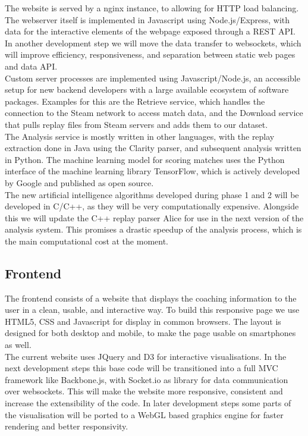 \documentclass[12pt]{report} %
\begin{document}
The website is served by a nginx instance, to allowing for HTTP load balancing. The webserver itself is implemented in Javascript using Node.js/Express, with data for the interactive elements of the webpage exposed through a REST API. In another development step we will move the data transfer to websockets, which will improve efficiency, responsiveness, and separation between static web pages and data API.\\

Custom server processes are implemented using Javascript/Node.js, an accessible setup for new backend developers with a large available ecosystem of software packages. Examples for this are the Retrieve service, which handles the connection to the Steam network to access match data, and the Download service that pulls replay files from Steam servers and adds them to our dataset.\\ 

The Analysis service is mostly written in other languages, with the replay extraction done in Java using the Clarity parser, and subsequent analysis written in Python. The machine learning model for scoring matches uses the Python interface of the machine learning library TensorFlow, which is actively developed by Google and published as open source.\\

The new artificial intelligence algorithms developed during phase 1 and 2 will be developed in C/C++, as they will be very computationally expensive. Alongside this we will update the C++ replay parser Alice for use in the next version of the analysis system. This promises a drastic speedup of the analysis process, which is the main computational cost at the moment. \\ 

\subsection{Frontend}

The frontend consists of a website that displays the coaching information to the user in a clean, usable, and interactive way. To build this responsive page we use HTML5, CSS and Javascript for display in common browsers. The layout is designed for both desktop and mobile, to make the page usable on smartphones as well.\\

The current website uses JQuery and D3 for interactive visualisations. In the next development steps this base code will be transitioned into a full MVC framework like Backbone.js, with Socket.io as library for data communication over websockets. This will make the website more responsive, consistent and increase the extensibility of the code. In later development steps some parts of the visualisation will be ported to a WebGL based graphics engine for faster rendering and better responsivity.
\end{document}
